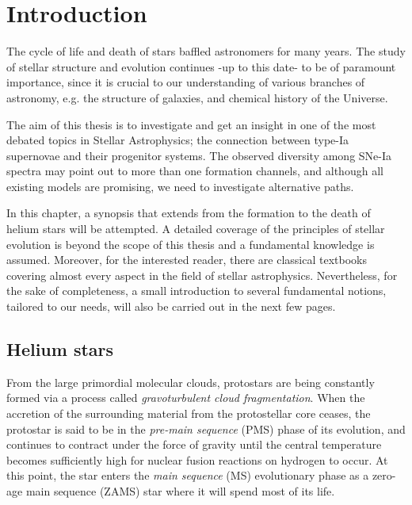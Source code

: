 \documentclass[../../main/thesis_msc.tex]{subfiles}
\begin{document}
    \chapter{Introduction}
    
		The cycle of life and death of stars  baffled astronomers for many years. The study of stellar structure and evolution continues -up to this date- to be of paramount importance, since it is crucial to our understanding of various branches of astronomy, e.g. the structure of galaxies, and chemical history of the Universe.
		
		The aim of this thesis is to investigate and get an insight in one of the most debated topics in Stellar Astrophysics; the connection between type-Ia supernovae and their progenitor systems. The observed diversity among SNe-Ia spectra may point out to more than one formation channels, and although all existing models are promising, we need to investigate alternative paths.
		
		In this chapter, a synopsis that extends from the formation to the death of helium stars will be attempted. A detailed coverage of the principles of stellar evolution is beyond the scope of this thesis and a fundamental knowledge is assumed. Moreover, for the interested reader, there are classical textbooks \citep{Kipp_book, Clayton, Prialnik, Eggleton_book} covering almost every aspect in the field of stellar astrophysics. Nevertheless, for the sake of completeness, a small introduction to several fundamental notions, tailored to our needs, will also be carried out in the next few pages. 
		

    
    
    \section{Helium stars}
    	
    	From the large primordial molecular clouds, protostars are being constantly formed via a process called \emph{gravoturbulent cloud fragmentation}. When the accretion of the surrounding material from the protostellar core ceases, the protostar is said to be in the \emph{pre-main sequence} (PMS) phase of its evolution, and continues to contract under the force of gravity until the central temperature becomes sufficiently high for nuclear fusion reactions on hydrogen to occur. At this point, the star enters the \emph{main sequence} (MS) evolutionary phase as a zero-age main sequence (ZAMS) star where it will spend most of its life.
    	
\end{document}
